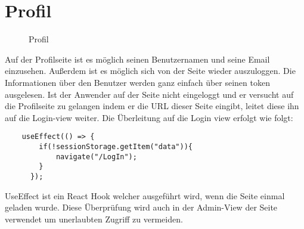 \section{Profil}
\label{profile}

\begin{figure}[H]
    \begin{center}
      \caption{Profil}
    \end{center}
\end{figure}

Auf der Profilseite ist es möglich seinen Benutzernamen und seine Email einzusehen. Außerdem ist es  
möglich sich von der Seite wieder auszuloggen. Die Informationen über den Benutzer werden ganz einfach über 
seinen token ausgelesen. Ist der Anwender auf der Seite nicht eingeloggt und er versucht auf die Profilseite
zu gelangen indem er die URL dieser Seite eingibt, leitet diese ihn auf die Login-view weiter. Die
Überleitung auf die Login view erfolgt wie folgt:

\begin{lstlisting}
    useEffect(() => {
        if(!sessionStorage.getItem("data")){
            navigate("/LogIn");
        }
      });
\end{lstlisting}

UseEffect ist ein React Hook welcher ausgeführt wird, wenn die Seite einmal geladen wurde. Diese 
Überprüfung wird auch in der Admin-View der Seite verwendet um unerlaubten Zugriff zu vermeiden.